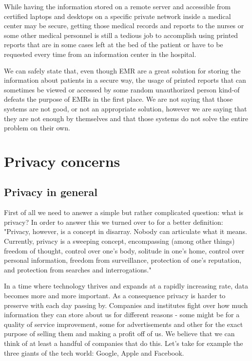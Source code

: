 While having the information stored on a remote server and accessible from certified laptops and desktops on a specific private network inside a medical center may be secure, getting those medical records and reports to the nurses or some other medical personnel is still a tedious job to accomplish using printed reports that are in some cases left at the bed of the patient or have to be requested every time from an information center in the hospital.

We can safely state that, even though EMR are a great solution for storing the information about patients in a secure way, the usage of printed reports that can sometimes be viewed or accessed by some random unauthorized person kind-of defeats the purpose of EMRs in the first place. We are not saying that those systems are not good, or not an appropriate solution, however we are saying that they are not enough by themselves and that those systems do not solve the entire problem on their own.

\section{Privacy concerns}
\label{sec:ch2sec5}

\subsection{Privacy in general}
\label{sec:ch2sec5subsec1}

\par First of all we need to answer a simple but rather complicated question: what is privacy? In order to answer this we turned over to \cite{solove2008understanding} for a better definition: "Privacy, however, is a concept in disarray. Nobody can articulate what it means. Currently, privacy is a sweeping concept, encompassing (among other things) freedom of thought, control over one’s body, solitude in one’s home, control over personal information, freedom from surveillance, protection of one’s reputation, and protection from searches and interrogations."

In a time where technology thrives and expands at a rapidly increasing rate, data becomes more and more important. As a consequence privacy is harder to preserve with each day passing by. Companies and institutes fight over how much information they can store about us for different reasons - some might be for a quality of service improvement, some for advertisements and other for the exact purpose of selling them and making a profit off of us. We believe that we can think of at least a handful of companies that do this. Let's take for example the three giants of the tech world: Google, Apple and Facebook. 

